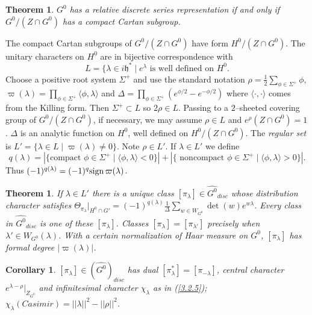 \documentclass{conm-p-l}
\newtheorem{theorem}[equation]{Theorem}
\newtheorem{corollary}[equation]{Corollary}
\def\gh{\mathfrak{h}}
\begin{document}
\begin{theorem}\label{3.4.1}
$G^0$ has a relative discrete series representation if and only if
$G^0/(Z\cap G^0)$ has a compact Cartan subgroup.
\end{theorem}

The compact Cartan subgroups of $G^0/(Z\cap G^0)$ have form $H^0/(Z\cap G^0)$.
The unitary characters on $H^0$ are in bijective correspondence with
\begin{equation}\label{3.4.2}
L = \{\lambda \in i\gh^* \mid e^\lambda \text{ is well defined on } H^0.
\end{equation}
Choose a positive root system $\Sigma^+$ and use the standard notation
$\rho = \tfrac{1}{2}\sum_{\phi \in \Sigma^+}\phi$,
$\varpi(\lambda) = \prod_{\phi \in \Sigma^+}\langle\phi,\lambda\rangle$ and
$\Delta = \prod_{\phi \in \Sigma^+}(e^{\phi/2}-e^{-\phi/2})$ where
$\langle\cdot,\cdot\rangle$ comes from the Killing form.  Then $\Sigma^+
\subset L$ so $2\rho \in L$.  Passing to a $2$--sheeted covering group of
$G^0/(Z\cap G^0)$, if necessary, we may assume $\rho \in L$ and 
$e^\rho(Z\cap G^0) = 1$.  $\Delta$ is an
analytic function on $H^0$, well defined on $H^0/(Z\cap G^0)$.
The {\em regular set} is $L' = \{\lambda \in L \mid \varpi(\lambda) \ne 0\}$.
Note $\rho \in L'$.  If $\lambda \in L'$ we define
{\footnotesize
\begin{equation}\label{3.4.6}
q(\lambda) = |\{\text{compact } \phi\in\Sigma^+ \mid 
	\langle\phi,\lambda\rangle < 0\}| +
|\{\text{ noncompact } \phi\in\Sigma^+ \mid 
        \langle\phi,\lambda\rangle > 0\}|.
\end{equation}
}
Thus $(-1)^{q(\lambda)} = (-1)^q\text{sign\,}\varpi(\lambda)$.

\begin{theorem}\label{3.4.7}
If $\lambda \in L'$ there is a unique class $[\pi_\lambda] \in
\widehat{G^0}_{disc}$ whose distribution character satisfies
$\Theta_{\pi_\lambda}|_{H^0\cap G'} = (-1)^{q(\lambda)}\tfrac{1}{\Delta}
	\sum_{w \in W_{G^0}} \det(w)e^{w\lambda}$.  Every class in
$\widehat{G^0}_{disc}$ is one of these $[\pi_\lambda]$.  Classes
$[\pi_\lambda] = [\pi_{\lambda'}]$ precisely when 
$\lambda' \in W_{G^0}(\lambda)$.  With a certain normalization of
Haar measure on $G^0$, $[\pi_\lambda]$ has formal degree $|\varpi(\lambda)|$.
\end{theorem}

\begin{corollary}\label{3.4.9} $[\pi_\lambda] \in (\widehat{G^0})_{disc}$
has dual $[\pi_\lambda^*] = [\pi_{-\lambda}]$, central character
$e^{\lambda - \rho}|_{Z_{G^0}}$ and infinitesimal character $\chi_\lambda$ 
as in {\rm (\ref{3.2.5})}; $\chi_\lambda(Casimir)
= ||\lambda||^2 - ||\rho||^2$.
\end{corollary}
\end{document}
